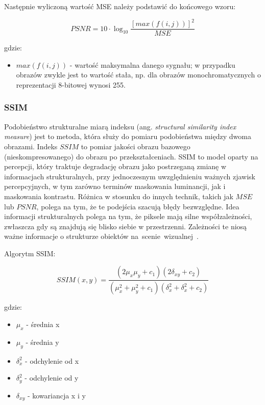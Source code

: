 \documentclass{article}
\begin{document}
Następnie wyliczoną wartość MSE należy podstawić do końcowego wzoru: 

\begin{equation}
PSNR = 10 \cdot \log_10 \frac{[max(f(i,j))]^2}{MSE}
\end{equation}

gdzie:
\begin{itemize}[label=]
    \item $max(f(i,j))$ - wartość maksymalna danego sygnału; w przypadku obrazów zwykle jest to wartość stała,
      np. dla obrazów monochromatycznych o reprezentacji 8-bitowej wynosi 255.
\end{itemize}

\subsubsection{SSIM}

Podobieństwo strukturalne miarą indeksu (ang. \emph{structural similarity index measure}) jest to metoda, która służy 
do pomiaru podobieństwa między dwoma obrazami. Indeks $SSIM$ to pomiar jakości obrazu bazowego (nieskompresowanego) 
do obrazu po przekształceniach. SSIM to model oparty na percepcji, który traktuje degradację obrazu jako postrzeganą zmianę
w informacjach strukturalnych, przy jednoczesnym uwzględnieniu ważnych zjawisk percepcyjnych, w tym zarówno terminów maskowania 
luminancji, jak i maskowania kontrastu. Różnica w stosunku do innych technik, takich jak $MSE$ lub $PSNR$,
polega na tym, że te podejścia szacują błędy bezwzględne. Idea informacji strukturalnych polega na tym, że piksele mają silne współzależności,
zwłaszcza gdy są znajdują się blisko siebie w przestrzenni. Zależności te niosą ważne informacje o strukturze obiektów \mbox{na scenie wizualnej \cite{channappayya2008rate}.}

Algorytm SSIM:

\begin{equation}
SSIM(x, y) = \frac{(2\mu_{x}\mu_{y} + c_{1}) (2\delta_{xy} + c_2)}{(\mu_{x}^2 + \mu_{y}^2 + c_{1}) (\delta_{x}^2 + \delta_{x}^2 + c_2)}
\end{equation}

gdzie:
\begin{itemize}[label=]
    \item $\mu_{x}$ - średnia x
    \item $\mu_{y}$ - średnia y
    \item $\delta_{x}^2$ - odchylenie od x
    \item $\delta_{y}^2$ - odchylenie od y
    \item $\delta_{xy}$ - kowariancja x i y
\end{itemize}
\end{document}
